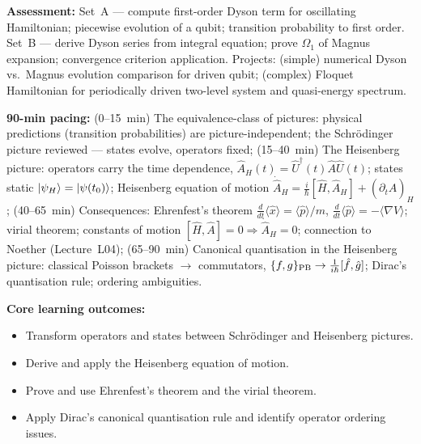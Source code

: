 \documentclass[11pt,a4paper]{article}
\begin{document}
\begin{tcolorbox}[modulebox, title={Module~I.3 --- Lecture L06: Time Evolution II --- Time-Dependent and Non-Commuting Hamiltonians}]
\medskip\textbf{Assessment:}
Set~A --- compute first-order Dyson term for oscillating Hamiltonian;
piecewise evolution of a qubit; transition probability to first order.
Set~B --- derive Dyson series from integral equation; prove $\Omega_1$ of
Magnus expansion; convergence criterion application.
Projects: (simple) numerical Dyson vs.\ Magnus evolution comparison for driven qubit;
(complex) Floquet Hamiltonian for periodically driven two-level system and
quasi-energy spectrum.
\end{tcolorbox}

\medskip
\begin{tcolorbox}[modulebox, title={Module~I.3 --- Lecture L07: Pictures of Quantum Mechanics and the Heisenberg Picture}]
\textbf{90-min pacing:} (0--15~min) The equivalence-class of pictures:
physical predictions (transition probabilities) are picture-independent;
the Schr\"odinger picture reviewed --- states evolve, operators fixed;
(15--40~min) The Heisenberg picture: operators carry the time dependence,
$\hat{A}_H(t)=\hat{U}^\dagger(t)\hat{A}\hat{U}(t)$; states static
$\ket{\psi_H}=\ket{\psi(t_0)}$; Heisenberg equation of motion
$\dot{\hat{A}}_H = \tfrac{i}{\hbar}[\hat{H},\hat{A}_H]+(\partial_t\hat{A})_H$;
(40--65~min) Consequences: Ehrenfest's theorem
$\tfrac{d}{dt}\langle\hat{x}\rangle=\langle\hat{p}\rangle/m$,
$\tfrac{d}{dt}\langle\hat{p}\rangle=-\langle\nabla V\rangle$;
virial theorem; constants of motion $[\hat{H},\hat{A}]=0\Rightarrow\dot{\hat{A}}_H=0$;
connection to Noether (Lecture~L04);
(65--90~min) Canonical quantisation in the Heisenberg picture:
classical Poisson brackets $\to$ commutators,
$\{f,g\}_{\rm PB}\to\tfrac{1}{i\hbar}[\hat{f},\hat{g}]$;
Dirac's quantisation rule; ordering ambiguities.

\medskip\textbf{Core learning outcomes:}
\begin{itemize}[leftmargin=1.4em,topsep=2pt,itemsep=1pt]
  \item Transform operators and states between Schr\"odinger and Heisenberg pictures.
  \item Derive and apply the Heisenberg equation of motion.
  \item Prove and use Ehrenfest's theorem and the virial theorem.
  \item Apply Dirac's canonical quantisation rule and identify operator ordering issues.
\end{itemize}


\end{tcolorbox}
\end{document}
